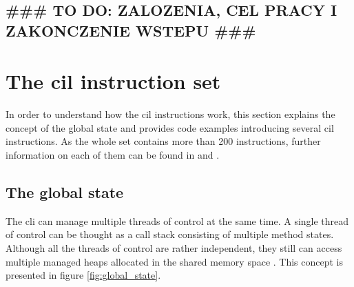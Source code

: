\documentclass{article}
\numberwithin{equation}{section}
\begin{document}
\subsection{{\#\#\# TO DO: ZALOZENIA, CEL PRACY I ZAKONCZENIE WSTEPU \#\#\#}}

\clearpage


\section{The \acrshort{cil} instruction set}

In order to understand how the \acrshort{cil} instructions work, this section explains the concept of the global state and provides code examples introducing several \acrshort{cil} instructions. As the whole set contains more than 200 instructions, further information on each of them can be found in \cite{ecmaStandard} and \cite{isoStandard}.

\subsection{The global state}
\label{sec:global_state}

The \acrshort{cli} can manage multiple threads of control at the same time. A single thread of control can be thought as a call stack consisting of multiple method states. Although all the threads of control are rather independent, they still can access multiple managed heaps allocated in the shared memory space \cite{ecmaStandard}. This concept is presented in figure \ref{fig:global_state}.
\end{document}
